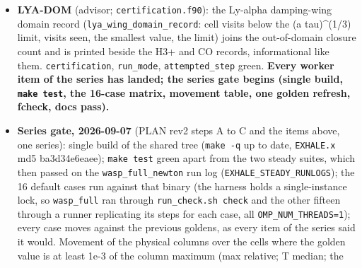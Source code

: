 \documentclass[english,a4paper]{my_memo}
\begin{document}
\begin{itemize}
{  at the base, x73 at 1.05, x37 at 1.10, x10 at 1.20, x0.75 at 1.50 R\_p; T
  within 2 percent; the old \texttt{min(1,.)} cap had zeroed the internal field
  from 1.15 R\_p outward.} H(n=2) chord column x31.5 at b = 1.00, x2.8 at
  1.20, x1.005 at 1.45: \textbf{every H-alpha/H-beta transit number in this
  repository from a \texttt{Jlya\ escape-prob:\ True} run is superseded} (He 10830
  not affected). Validity \texttt{(a\ tau)\^{}(1/3)\ \textgreater{}\ 10} holds in 349 of 504 cells,
  out to 1.193 R\_p, exactly where the change is an order of magnitude.
  Advisor follow-ups applied: the second \texttt{A\_2p1s} in \texttt{exhale\_transit\_lib.py}
  and \texttt{docs/transmission\_spectrum.tex} set to 6.2649e8 (one value with the
  wind model), the stale \texttt{E\ =\ min(boost,\ 1/beta)} comment in \texttt{parameters.f90}
  replaced by the implemented \texttt{1\ +\ (boost-1)(1-beta)\ T\_star}. Pending: the
  B6-style print of the Ly-alpha domain record in \texttt{certification.f90} (the
  record and accessor exist; LYA-DOM, with the gate\textquotesingle s follow-ups).
\item
  \textbf{LYA-DOM} (advisor; \texttt{certification.f90}): the Ly-alpha damping-wing
  domain record (\texttt{lya\_wing\_domain\_record}: cell visits below the
  (a tau)\^{}(1/3) limit, visits seen, the smallest value, the limit) joins the
  out-of-domain closure count and is printed beside the H3+ and CO records,
  informational like them. \texttt{certification}, \texttt{run\_mode}, \texttt{attempted\_step}
  green. \textbf{Every worker item of the series has landed; the series gate
  begins (single build, \texttt{make\ test}, the 16-case matrix, movement table,
  one golden refresh, fcheck, docs pass).}
\item
  \textbf{Series gate, 2026-09-07} (PLAN rev2 steps A to C and the items above,
  one series): single build of the shared tree (\texttt{make\ -q} up to date,
  \texttt{EXHALE.x} md5 ba3d34e6eaee); \texttt{make\ test} green apart from the two steady
  suites, which then passed on the \texttt{wasp\_full\_newton} run log
  (\texttt{EXHALE\_STEADY\_RUNLOGS}); the 16 default cases run against that binary
  (the harness holds a single-instance lock, so \texttt{wasp\_full} ran through
  \texttt{run\_check.sh\ check} and the other fifteen through a runner replicating
  its steps for each case, all \texttt{OMP\_NUM\_THREADS=1}); every case moves against
  the previous goldens, as every item of the series said it would.
  Movement of the physical columns over the cells where the golden value
  is at least 1e-3 of the column maximum (max relative; T median; the

\end{itemize}
\end{document}
